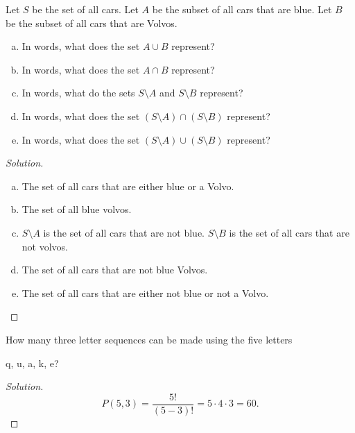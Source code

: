 \documentclass[12pt]{amsart}
\begin{document}
\begin{thm}[10 Points]\label{ex4}
  Let $S$ be the set of all cars.
  Let $A$ be the subset of all cars that are blue.
  Let $B$ be the subset of all cars that are Volvos.
  \begin{enumerate}[(a)]
  \item
    In words, what does the set $A \cup B$ represent?
  \item
    In words, what does the set $A \cap B$ represent?
  \item
    In words, what do the sets $S \setminus A$ and $S \setminus B$ represent?
  \item
    In words, what does the set $\left(S \setminus A\right) \cap \left(S \setminus B\right)$ represent?
  \item
    In words, what does the set $\left(S \setminus A\right) \cup \left(S \setminus B\right)$ represent?
  \end{enumerate}
  \begin{proof}[Solution]
    \begin{enumerate}[(a)]
    \item
      The set of all cars that are either blue or a Volvo.
    \item
      The set of all blue volvos.
    \item
      $S\setminus A$ is the set of all cars that are not blue.
      $S\setminus B$ is the set of all cars that are not volvos.
    \item
      The set of all cars that are not blue Volvos.
    \item
      The set of all cars that are either not blue or not a Volvo.
    \end{enumerate}
  \end{proof}
\end{thm}

\newpage

\begin{thm}[10 Points]\label{ex3}
  How many three letter sequences can be made using the five letters 
  \begin{center}q, u, a, k, e?\end{center}
  \begin{proof}[Solution]
    $$P(5,3) = \frac{5!}{(5 - 3)!} = 5 \cdot 4 \cdot 3 = 60.$$
  \end{proof}
    
\end{thm}
\end{document}
